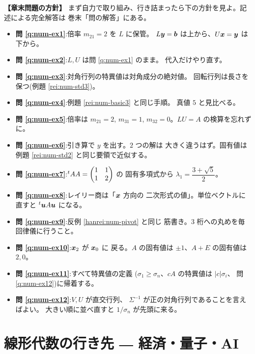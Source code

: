 \bigskip
{\small
\noindent\textbf{【章末問題の方針】}\quad
まず自力で取り組み、行き詰まったら下の方針を見よ。記述による完全解答は
巻末「問の解答」にある。
\begin{itemize}
\item \textbf{問 \ref{q:num-ex1}}:倍率 $m_{21} = 2$ を $L$ に保管。
$L\bm{y} = \bm{b}$ は上から、$U\bm{x} = \bm{y}$ は下から。
\item \textbf{問 \ref{q:num-ex2}}:$L, U$ は問 \ref{q:num-ex1} のまま。
代入だけやり直す。
\item \textbf{問 \ref{q:num-ex3}}:対角行列の特異値は対角成分の絶対値。
回転行列は長さを保つ(例題 \ref{rei:num-std3})。
\item \textbf{問 \ref{q:num-ex4}}:例題 \ref{rei:num-basic3} と同じ手順。
真値 $5$ と見比べる。
\item \textbf{問 \ref{q:num-ex5}}:倍率は $m_{21} = 2$, $m_{31} = 1$,
$m_{32} = 0$。$LU = A$ の検算を忘れずに。
\item \textbf{問 \ref{q:num-ex6}}:引き算で $y$ を出す。$2$ つの解は
大きく違うはず。固有値は例題 \ref{rei:num-std2} と同じ要領で近似する。
\item \textbf{問 \ref{q:num-ex7}}:${}^tAA = \begin{pmatrix}1 & 1 \\ 1 & 2\end{pmatrix}$ の
固有多項式から $\lambda_1 = \dfrac{3 + \sqrt{5}}{2}$。
\item \textbf{問 \ref{q:num-ex8}}:レイリー商は「$\bm{x}$ 方向の
二次形式の値」。単位ベクトルに直すと ${}^t\bm{u}A\bm{u}$ になる。
\item \textbf{問 \ref{q:num-ex9}}:反例 \ref{hanrei:num-pivot} と同じ
筋書き。$3$ 桁への丸めを毎回律儀に行うこと。
\item \textbf{問 \ref{q:num-ex10}}:$\bm{x}_2$ が $\bm{x}_0$ に
戻る。$A$ の固有値は $\pm 1$、$A + E$ の固有値は $2, 0$。
\item \textbf{問 \ref{q:num-ex11}}:すべて特異値の定義
($\sigma_1 \ge \sigma_n$、$cA$ の特異値は $|c|\sigma_i$、
問 \ref{q:num-ex12})に帰着する。
\item \textbf{問 \ref{q:num-ex12}}:$V, U$ が直交行列、
$\Sigma^{-1}$ が正の対角行列であることを言えばよい。
大きい順に並べ直すと $1/\sigma_n$ が先頭に来る。
\end{itemize}
}

\chapter{線形代数の行き先 ― 経済・量子・AI}\label{chap:final}

